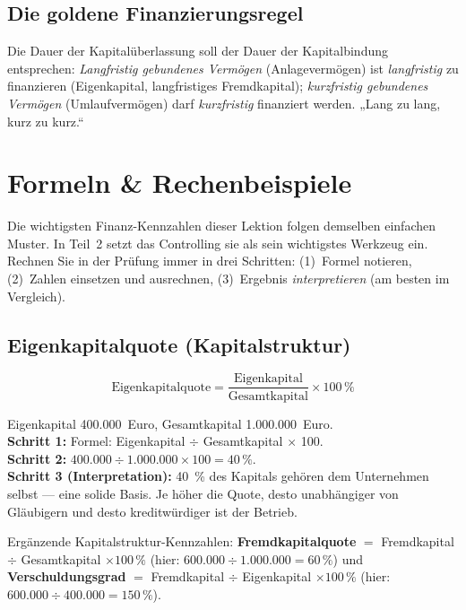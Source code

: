 \documentclass[11pt, a4paper]{article}
\begin{document}
\subsection{Die goldene Finanzierungsregel}

\begin{merksatz}[title={\bfseries Goldene Finanzierungsregel (Fristenkongruenz)}]
Die Dauer der Kapitalüberlassung soll der Dauer der Kapitalbindung entsprechen:
\emph{Langfristig gebundenes Vermögen} (Anlagevermögen) ist \emph{langfristig} zu
finanzieren (Eigenkapital, langfristiges Fremdkapital); \emph{kurzfristig gebundenes
Vermögen} (Umlaufvermögen) darf \emph{kurzfristig} finanziert werden.
„Lang zu lang, kurz zu kurz.``
\end{merksatz}

\section{Formeln \& Rechenbeispiele}\label{sec:formeln}

Die wichtigsten Finanz-Kennzahlen dieser Lektion folgen demselben einfachen Muster.
In Teil~2 setzt das Controlling sie als sein wichtigstes Werkzeug ein. Rechnen Sie in der
Prüfung immer in drei Schritten: (1)~Formel notieren, (2)~Zahlen einsetzen und
ausrechnen, (3)~Ergebnis \emph{interpretieren} (am besten im Vergleich).

\subsection{Eigenkapitalquote (Kapitalstruktur)}

\[
\mbox{Eigenkapitalquote} = \frac{\mbox{Eigenkapital}}{\mbox{Gesamtkapital}} \times 100\,\%
\]

\begin{beispiel}[title={Beispiel: Eigenkapitalquote}]
Eigenkapital 400.000~Euro, Gesamtkapital 1.000.000~Euro.\\
\textbf{Schritt 1:} Formel: Eigenkapital $\div$ Gesamtkapital $\times$ 100.\\
\textbf{Schritt 2:} $400.000 \div 1.000.000 \times 100 = 40\,\%$.\\
\textbf{Schritt 3 (Interpretation):} 40~\% des Kapitals gehören dem Unternehmen selbst
--- eine solide Basis. Je höher die Quote, desto unabhängiger von Gläubigern und desto
kreditwürdiger ist der Betrieb.
\end{beispiel}

Ergänzende Kapitalstruktur-Kennzahlen: \textbf{Fremdkapitalquote} $=$ Fremdkapital
$\div$ Gesamtkapital $\times 100\,\%$ (hier: $600.000 \div 1.000.000 = 60\,\%$) und
\textbf{Verschuldungsgrad} $=$ Fremdkapital $\div$ Eigenkapital $\times 100\,\%$
(hier: $600.000 \div 400.000 = 150\,\%$).
\end{document}
